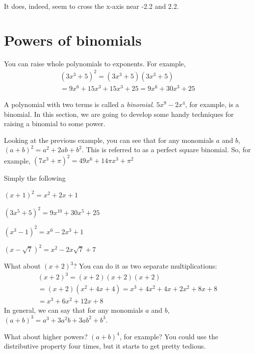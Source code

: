 It does, indeed, seem to cross the x-axis near -2.2 and 2.2.

\section{Powers of binomials}

You can raise whole polynomials to exponents. For example,
\begin{multline*}
  (3x^3 + 5)^2 = (3x^3 + 5)(3x^3 + 5) \\ = 9x^6 + 15x^3 + 15x^3 + 25 = 9x^6 + 30x^3 + 25 
\end{multline*}

A polynomial with two terms is called a \emph{binomial}. $5x^9 - 2x^4$,
for example, is a binomial. In this section, we are going to
develop some handy techniques for raising a binomial to some power.

Looking at the previous example, you can see that for any monomials $a$ and $b$, $(a + b)^2 = a^2 + 2ab + b^2$. This is referred to as a perfect square binomial. 
So, for example, $(7x^3 + \pi)^2 = 49x^6 + 14\pi x^3 + \pi^2$

\begin{Exercise}[title={Squaring binomials}, label=squaringbinomials]
  Simply the following
  
\end{Exercise}
\begin{Answer}[ref=squaringbinomials]
  $(x+1)^2 = x^2 + 2x + 1$

  $(3x^5 + 5)^2 = 9x^10 + 30x^5 + 25$

  $(x^3 - 1)^2 = x^6 - 2x^3 + 1$

  $(x - \sqrt{7})^2 = x^2 - 2x\sqrt{7} + 7$
\end{Answer}

What about $(x + 2)^3$? You can do it as two separate multiplications:
\begin{multline*}
  (x+2)^3 = (x+2)(x+2)(x+2) \\
  = (x + 2)(x^2 + 4x + 4) = x^3 + 4x^2 + 4x + 2x^2 + 8x + 8 \\
  = x^3 + 6x^2 + 12x + 8
\end{multline*}
In general, we can say that for any monomials $a$ and $b$, $(a + b)^3 = a^3 + 3a^2b + 3ab^2 + b^3$.

What about higher powers? $(a + b)^4$, for example? You could use the
distributive property four times, but it starts to get pretty tedious.

